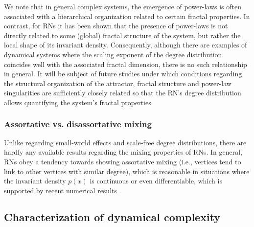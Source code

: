 \documentclass[graybox]{svmult}
\begin{document}
We note that in general complex systems, the emergence of power-laws is often associated with a hierarchical organization related to certain fractal properties. In contrast, for RNs it has been shown that the presence of power-laws is not directly related to some (global) fractal structure of the system, but rather the local shape of its invariant density. Consequently, although there are examples of dynamical systems where the scaling exponent of the degree distribution coincides well with the associated fractal dimension, there is no such relationship in general. It will be subject of future studies under which conditions regarding the structural organization of the attractor, fractal structure and power-law singularities are sufficiently closely related so that the RN's degree distribution allows quantifying the system's fractal properties.


\subsubsection{Assortative vs. disassortative mixing}

Unlike regarding small-world effects and scale-free degree distributions, there are hardly any available results regarding the mixing properties of RNs. In general, RNs obey a tendency towards showing assortative mixing (i.e., vertices tend to link to other vertices with similar degree), which is reasonable in situations where the invariant density $p(x)$ is continuous or even differentiable, which is supported by recent numerical results \cite{Donges2011NPG,Donner2010NJP}. 


\subsection{Characterization of dynamical complexity}\label{sec:complexity}
\end{document}
